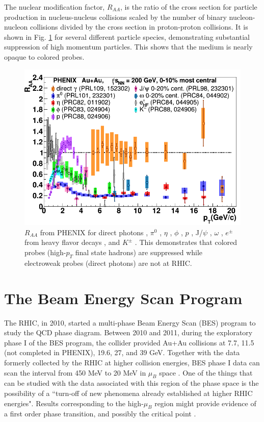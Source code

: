 The nuclear modification factor, $R_{AA}$, is the ratio of the cross section for particle production in nucleus-nucleus collisions scaled by the number of binary nucleon-nucleon collisions divided by the cross section in proton-proton collisions.  It is shown in Fig. \ref{fig:Raa} for several different particle species, demonstrating substantial suppression of high momentum particles. This shows that the medium is nearly opaque to colored probes.
	\begin{figure}[h]
	  \centering
	  \includegraphics[width=6.5in]{figures/Raa.PNG}
	  \caption{$R_{AA}$ from PHENIX for direct photons \cite{Afanasiev:2012dg}, $\pi^0$ \cite{Adare:2008qa}, $\eta$ \cite{Adare:2010dc}, $\phi$ \cite{Adare:2015ema}, $p$ \cite{Adare:2013esx}, J/$\psi$ \cite{Adare:2006ns}, $\omega$ \cite{Adare:2011ht}, $e^{\pm}$ from heavy flavor decays \cite{Adare:2010de}, and $K^{\pm}$ \cite{Adare:2013esx}.  This demonstrates that colored probes (high-$p_{T}$ final state hadrons) are suppressed while electroweak probes (direct photons) are not at RHIC.}\label{fig:Raa}
	\end{figure}
	

\section{The Beam Energy Scan Program}
The RHIC, in 2010, started a multi-phase Beam Energy Scan (BES) program to study the QCD phase diagram. Between 2010 and 2011, during the exploratory phase I of the BES program, the collider provided Au+Au collisions at 7.7, 11.5 (not completed in PHENIX), 19.6, 27, and 39 GeV. Together with the data formerly collected by the RHIC at higher collision energies, BES phase I data can scan the interval from 450 MeV to 20 MeV in $\mu_{B}$ space \cite{1742-6596-455-1-012037, LUO201675}. One of the things that can be studied with the data associated with this region of the phase space is the possibility of a ``turn-off of new phenomena already established at higher RHIC energies"\cite{1742-6596-455-1-012037}. Results corresponding to the high-$\mu_{B}$ region might provide evidence of a first order phase transition, and possibly the critical point \cite{LUO201675}.

